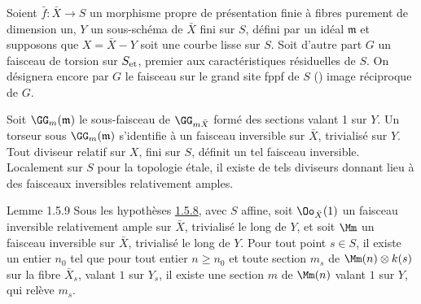 \setcounter{subsubsection}{7}
\subsubsection{}
Soient $\bar{f}:\bar{X}\rightarrow S$ un morphisme propre de
présentation finie à fibres purement de dimension un, $Y$ un
sous-schéma de $\bar{X}$ fini sur $S$, défini par un idéal $\mathfrak{m}$ et
supposons que $X=\bar{X}-Y$ soit une courbe lisse sur $S$. Soit
d'autre part $G$ un faisceau de torsion sur $S_{\text{\rm et}}$,
premier aux caractéristiques résiduelles de $S$. On désignera encore
par $G$ le faisceau sur le grand site fppf de $S$ () image
réciproque de $G$.

Soit $\GG_{m}(\mathfrak{m})$ le sous-faisceau de $\GG_{m\bar{X}}$
formé des sections valant 1 sur $Y$. Un torseur sous
$\GG_{m}(\mathfrak{m})$ s'identifie à un faisceau inversible sur $\bar{X}$,
trivialisé sur $Y$. Tout diviseur relatif sur $X$, fini sur $S$,
définit un tel faisceau inversible. Localement sur $S$ pour la
topologie étale, il existe de tels diviseurs donnant lieu à des
faisceaux inversibles relativement amples.

\begin{enonce*}{Lemme 1.5.9}
Sous les hypothèses \hyperref[XVIII.subsubsec1.5.8]{1.5.8}, avec $S$ affine,
soit $\Oo_{\bar{X}}(1)$ un faisceau inversible relativement ample sur
$\bar{X}$, trivialisé le long de $Y$, et soit $\Mm$ un
faisceau inversible sur $\bar{X}$, trivialisé le long de $Y$. Pour
tout point $s\in S$, il existe un entier $n_{0}$ tel que pour tout
entier $n\geq n_{0}$ et toute section $m_{s}$ de
$\Mm(n)\otimes k(s)$ sur la fibre $\bar{X}_{s}$, valant $1$
sur $Y_{s}$, il existe une section $m$ de $\Mm(n)$ valant $1$
sur $Y$, qui relève $m_{s}$.
\end{enonce*}


